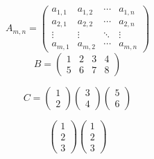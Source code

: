 \documentclass[16pt, a4paper]{article} %
\begin{document}
    \begin{equation*}
    A_{m,n} = 
        \begin{pmatrix}
            a_{1,1} & a_{1,2} & \cdots & a_{1,n} \\
            a_{2,1} & a_{2,2} & \cdots & a_{2,n} \\
            \vdots  & \vdots  & \ddots & \vdots  \\
            a_{m,1} & a_{m,2} & \cdots & a_{m,n} 
        \end{pmatrix}
    \end{equation*}
    \begin{equation*}
    B = 
        \begin{pmatrix}
            1 & 2 & 3 & 4 \\
            5 & 6 & 7 & 8
        \end{pmatrix}
    \end{equation*}
    
    \begin{equation*}
     C = 
        \begin{pmatrix}
         1 \\
         2
        \end{pmatrix}
        \begin{pmatrix}
         3 \\
         4
        \end{pmatrix}
        \begin{pmatrix}
         5 \\
         6
        \end{pmatrix}
    \end{equation*}

    \begin{equation*}
        \begin{pmatrix}
            1 \\
            2 \\
            3
        \end{pmatrix}
        \begin{pmatrix}
            1 \\
            2 \\
            3
            \end{pmatrix}
    \end{equation*}
\end{document}
